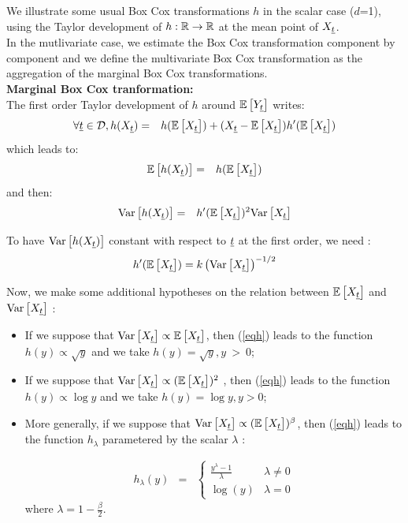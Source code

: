We illustrate some usual Box Cox transformations $h$ in the scalar case ($d$=1), using the Taylor development of $h: {\mathbb R} \rightarrow {\mathbb R}$ at the mean point of  $X_{{\underline{t}}}$. \\
In the mutlivariate case, we estimate the Box Cox transformation component by component and we define the multivariate Box Cox transformation as the aggregation of the marginal Box Cox transformations.\\

{\bf Marginal Box Cox tranformation: }\\
The first order Taylor development of $h$ around ${\mathbb E}\left[ Y_{{\underline{t}}} \right]$ writes:
\begin{eqnarray*}
  \forall {\underline{t}} \in {\mathcal D}, h(X_{{\underline{t}}}) & = & h({\mathbb E}\left[ X_{{\underline{t}}} \right]) + (X_{{\underline{t}}} - {\mathbb E}\left[ X_{{\underline{t}}} \right])h'({\mathbb E}\left[ X_{{\underline{t}}} \right])
\end{eqnarray*}
which leads to:
\begin{eqnarray*}
  {\mathbb E}\left[ h(X_{{\underline{t}}}) \right] & = & h({\mathbb E}\left[ X_{{\underline{t}}} \right])
\end{eqnarray*}
and then:
\begin{eqnarray*}
  {\rm Var}\left[ h(X_{{\underline{t}}}) \right] & = & h'({\mathbb E}\left[ X_{{\underline{t}}} \right])^2  {\rm Var}\left[ X_{{\underline{t}}} \right]
\end{eqnarray*}



To have $ {\rm Var}\left[ h(X_{{\underline{t}}}) \right]$ constant with respect to ${\underline{t}}$ at the first order, we need :
\begin{eqnarray}\label{eqh}
  h'({\mathbb E}\left[ X_{{\underline{t}}} \right]) = k \left(  {\rm Var}\left[ X_{{\underline{t}}} \right] \right)^{-1/2}
\end{eqnarray}

Now, we make some additional hypotheses on the relation between ${\mathbb E}\left[ X_{{\underline{t}}} \right]$ and ${\rm Var}\left[ X_{{\underline{t}}} \right]$ :
\begin{itemize}
\item If we suppose that  ${\rm Var}\left[ X_{{\underline{t}}} \right] \propto {\mathbb E}\left[ X_{{\underline{t}}} \right]$,  then (\ref{eqh}) leads to the function $h(y) \propto \sqrt{y}$ and we take $h(y) = \sqrt{y}, y~>~0$;
\item If we suppose that ${\rm Var}\left[ X_{{\underline{t}}} \right] \propto ({\mathbb E}\left[ X_{{\underline{t}}} \right])^2$ , then  (\ref{eqh}) leads to the function $h(y) \propto \log{y}$ and we take $h(y) = \log{y}, y>0$;
\item More generally, if we suppose that ${\rm Var}\left[ X_{{\underline{t}}} \right] \propto ({\mathbb E}\left[ X_{{\underline{t}}} \right])^{\beta}$, then (\ref{eqh}) leads to the function $h_\lambda$ parametered by the scalar $\lambda$ :

  \begin{eqnarray}
    \label{BoxCoxModel}
    h_\lambda(y) & = &
    \left\{
    \begin{array}{ll}
      \frac{y^\lambda-1}{\lambda} & \lambda \neq 0 \\
      \log(y)                      & \lambda = 0
    \end{array}
    \right.
  \end{eqnarray}
  where $\lambda = 1-\frac{\beta}{2}$.
\end{itemize}

